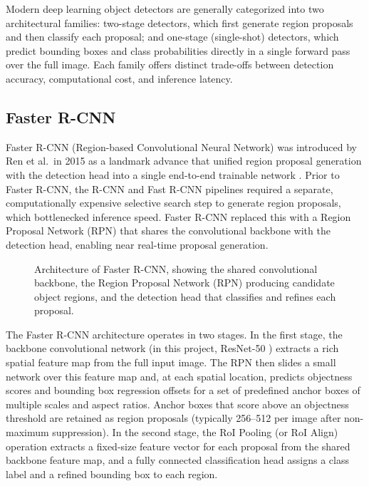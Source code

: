 Modern deep learning object detectors are generally categorized into two architectural families:
two-stage detectors, which first generate region proposals and then classify each proposal; and
one-stage (single-shot) detectors, which predict bounding boxes and class probabilities directly
in a single forward pass over the full image. Each family offers distinct trade-offs between
detection accuracy, computational cost, and inference latency.

\subsection{Faster R-CNN}

Faster R-CNN (Region-based Convolutional Neural Network) was introduced by Ren et al.\ in 2015
as a landmark advance that unified region proposal generation with the detection head into a
single end-to-end trainable network \cite{ren2015faster}. Prior to Faster R-CNN, the R-CNN
and Fast R-CNN pipelines required a separate, computationally expensive selective search step
to generate region proposals, which bottlenecked inference speed. Faster R-CNN replaced this
with a Region Proposal Network (RPN) that shares the convolutional backbone with the detection
head, enabling near real-time proposal generation.

\begin{figure}[H]
  \centering
  \caption{Architecture of Faster R-CNN, showing the shared convolutional backbone, the Region
    Proposal Network (RPN) producing candidate object regions, and the detection head that
    classifies and refines each proposal.}
  \label{fig:faster_rcnn}
\end{figure}

The Faster R-CNN architecture operates in two stages. In the first stage, the backbone
convolutional network (in this project, ResNet-50 \cite{he2016deep}) extracts a rich
spatial feature map from the full input image. The RPN then slides a small network over
this feature map and, at each spatial location, predicts objectness scores and bounding
box regression offsets for a set of predefined anchor boxes of multiple scales and aspect
ratios. Anchor boxes that score above an objectness threshold are retained as region proposals
(typically 256--512 per image after non-maximum suppression). In the second stage, the
RoI Pooling (or RoI Align) operation extracts a fixed-size feature vector for each proposal
from the shared backbone feature map, and a fully connected classification head assigns a
class label and a refined bounding box to each region.

